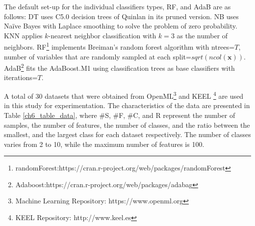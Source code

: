 The default set-up for the individual classifiers types, RF, and AdaB are as follows: DT uses C5.0 decision trees of Quinlan \cite{quinlan2014} in its pruned version. NB uses Naïve Bayes with Laplace smoothing to solve the problem of zero probability. KNN applies $k$-nearest neighbor classification with $k=3$ as the number of neighbors. RF\footnote{randomForest:https://cran.r-project.org/web/packages/randomForest} implements Breiman’s random forest algorithm with ntrees=$T$, number of variables that are randomly sampled at each split=$sqrt(ncol(\textbf{x}))$. AdaB\footnote{Adaboost:https://cran.r-project.org/web/packages/adabag} fits the AdaBoost.M1 using classification trees as base classifiers with iterations=$T$.


A total of 30 datasets that were obtained from OpenML\footnote{ Machine Learning Repository: https://www.openml.org} and KEEL \footnote{KEEL Repository: http://www.keel.es} are used in this study for experimentation. The characteristics of the data are presented in Table \ref{ch6_table_data}, where \#S, \#F, \#C, and R represent the number of samples, the number of features, the number of classes, and the ratio between the smallest, and the largest class for each dataset respectively. The number of classes varies from 2 to 10, while the maximum number of features is 100. 



\vspace*{.3cm}

